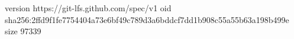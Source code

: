 version https://git-lfs.github.com/spec/v1
oid sha256:2ffd9f1fe7754404a73e6bf49c789d3a6bddcf7dd1b908c55a55b63a198b499e
size 97339
